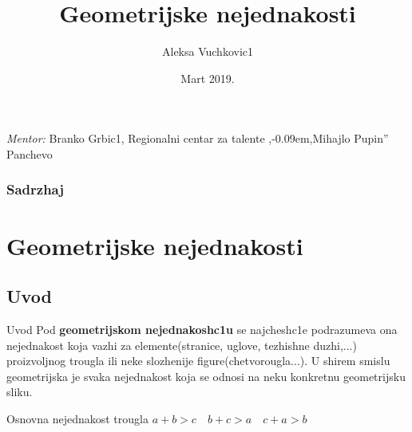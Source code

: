 \documentclass{beamer}
\title{Geometrijske nejednakosti}
\author{Aleksa Vuchkovic1}
\institute{Matematichka gimnazija}
\date{Mart 2019.}
\def \zn{,\kern-0.09em,}
\begin{document}
\begin{frame}{}
    \titlepage
    \begin{center}
        \emph{Mentor:} Branko Grbic1, Regionalni centar za talente \zn Mihajlo Pupin'' Panchevo
    \end{center}
\end{frame}
\begin{frame}
\frametitle{Sadrzhaj}
\tableofcontents
\end{frame}

\section{Geometrijske nejednakosti}
\subsection{Uvod}
\begin{frame}{Uvod}
 Pod \textbf{geometrijskom nejednakosh{}c1u} se najchesh{}c1e podrazumeva ona nejednakost koja vazhi za elemente(stranice, uglove, tezhishne duzhi,...) proizvoljnog trougla ili neke slozhenije figure(chetvorougla...). U shirem smislu geometrijska je svaka nejednakost koja se odnosi na neku konkretnu geometrijsku sliku.\\
 \begin{block}{Osnovna nejednakost trougla}
 \centering $a+b>c \quad b+c>a\quad c+a>b$
\end{block}
\end{frame}
\end{document}
